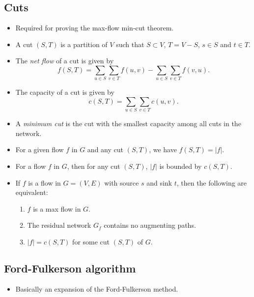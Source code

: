 \subsection{Cuts}
\begin{itemize}
\item Required for proving the max-flow min-cut theorem.
\item A cut $(S,T)$ is a partition of $V$ such that $S \subset V$, $T
  = V - S$, $s \in S$ and $t \in T$.
\item The \emph{net flow} of a cut is given by
  $$
    f(S,T) = \sum_{u\in S} \sum_{v \in T} f(u,v) - \sum_{u \in S} \sum_{v \in T} f(v,u).
  $$
\item The capacity of a cut is given by
  $$
    c(S,T) = \sum_{u\in S} \sum_{v \in T} c(u,v).
  $$
\item A \emph{minimum cut} is the cut with the smallest capacity among
  all cuts in the network.

\item {} For a given flow $f$ in $G$ and any cut
  $(S,T)$, we have $f(S,T) = |f|$.

\item {} For a flow $f$ in $G$, then for any cut
  $(S,T)$, $|f|$ is bounded by $c(S,T)$.

\item {} If $f$ is a flow in $G = (V,E)$ with
  source $s$ and sink $t$, then the following are equivalent:
  \begin{enumerate}
  \item $f$ is a max flow in $G$.
  \item The residual network $G_f$ contains no augmenting paths.
  \item $|f| = c(S,T)$ for some cut $(S,T)$ of $G$.
  \end{enumerate}
\end{itemize}

\subsection{Ford-Fulkerson algorithm}
\begin{itemize}
\item {} Basically an expansion of the Ford-Fulkerson method.
\end{itemize}


